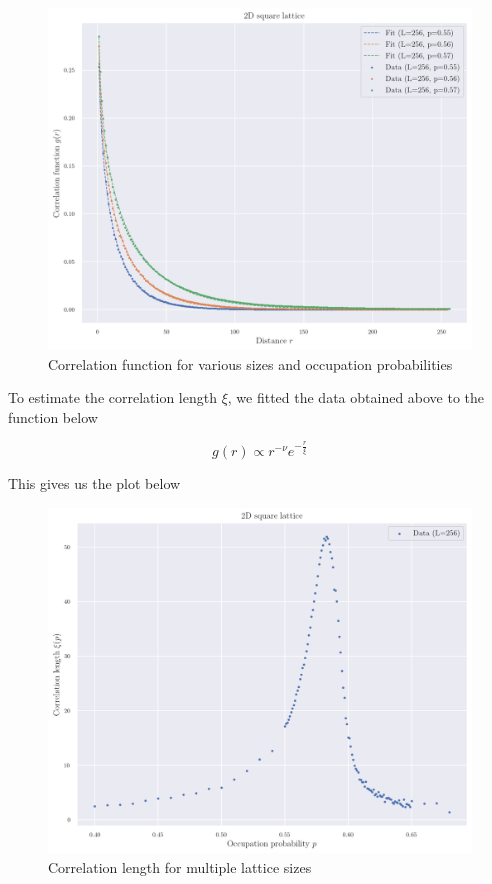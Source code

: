 \begin{figure}[H]
  \includegraphics[width=\linewidth]{Images/sec3_corr_func_1.png}
  \caption{Correlation function for various sizes and occupation probabilities}
  \label{fig:sec3_corr_func_1}
\end{figure}


To estimate the correlation length $\xi$, we fitted the data obtained above to the function below

$$ 
 g(r) \propto r^{-\nu} e^{-\frac{r}{\xi}}
$$ 

This gives us the plot below

\begin{figure}[H]
  \includegraphics[width=\linewidth]{Images/sec3_corr_length_1.png}
  \caption{Correlation length for multiple lattice sizes}
  \label{fig:sec3_corr_length_1}
\end{figure}






\clearpage
